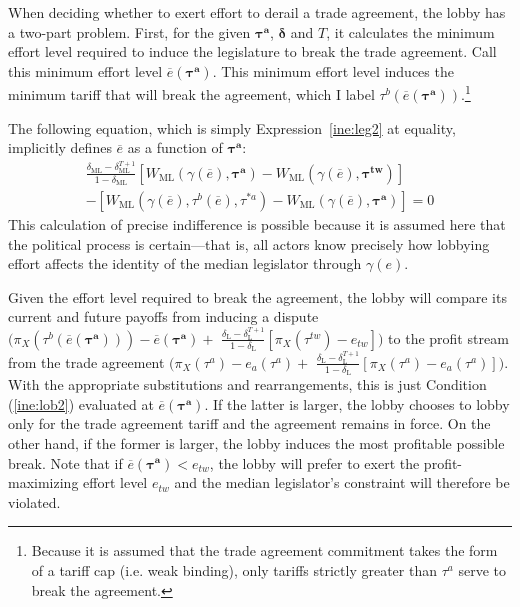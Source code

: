 \documentclass[authoryear, review]{elsarticle}
\newcommand{\ov}{\overline}
\newcommand{\bta}{\bm{\tau^a}}
\newcommand{\ga}{\gamma}
\newcommand{\btw}{\bm{\tau^{tw}}}
\newcommand{\de}{\delta}
\begin{document}
When deciding whether to exert effort to derail a trade agreement, the lobby has a two-part problem. First, for the given $\bta$, $\bm{\de}$ and $T$, it calculates the minimum effort level required to induce the legislature to break the trade agreement. Call this minimum effort level $\ov{e}(\bta)$. This minimum effort level induces the minimum tariff that will break the agreement, which I label $\tau^b(\ov{e}(\bta))$.\footnote{Because it is assumed that the trade agreement commitment takes the form of a tariff cap (i.e. weak binding), only tariffs strictly greater than $\tau^a$ serve to break the agreement.}

The following equation, which is simply Expression~\ref{ine:leg2} at equality, implicitly defines $\ov{e}$ as a function of $\bta$:
\begin{multline}
  \frac{\de_\text{ML} - \de_\text{ML}^{T+1}}{1-\de_\text{ML}} \left[W_\text{ML}(\ga(\ov{e}),\bta) - W_\text{ML}(\ga(\ov{e}),\btw) \right] \\
	- \left[ W_\text{ML}(\ga(\ov{e}),\tau^b(\ov{e}),\tau^{*a}) - W_\text{ML}(\ga(\ov{e}),\bta) \right] = 0
  \label{eq:leg2}
\end{multline}
This calculation of precise indifference is possible because it is assumed here that the political process is certain---that is, all actors know precisely how lobbying effort affects the identity of the median legislator through $\ga(e)$.

Given the effort level required to break the agreement, the lobby will compare its current and future payoffs from inducing a dispute $\Big(\pi_X(\tau^b(\ov{e}(\bta))) - \ov{e}(\bta) +$ $\frac{\de_\text{L} - \de_\text{L}^{T+1}}{1-\de_\text{L}} \left[\pi_X(\tau^{tw}) -e_{tw}\right] \Big)$ to the profit stream from the trade agreement $\Big(\pi_X(\tau^a) - e_a(\tau^a) +$ $\frac{\de_\text{L} - \de_\text{L}^{T+1}}{1-\de_\text{L}} \left[\pi_X(\tau^a) -e_a(\tau^a)\right] \Big)$. With the appropriate substitutions and rearrangements, this is just Condition (\ref{ine:lob2}) evaluated at $\ov{e}(\bta)$. If the latter is larger, the lobby chooses to lobby only for the trade agreement tariff and the agreement remains in force. On the other hand, if the former is larger, the lobby induces the most profitable possible break. Note that if $\ov{e}(\bta) < e_{tw}$, the lobby will prefer to exert the profit-maximizing effort level $e_{tw}$ and the median legislator's constraint will therefore be violated. 

\end{document}
